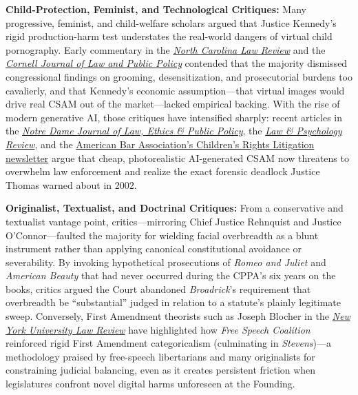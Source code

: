 \documentclass[12pt]{article}
\begin{document}
\textbf{Child-Protection, Feminist, and Technological Critiques:} Many progressive, feminist, and child-welfare scholars argued that Justice Kennedy's rigid production-harm test understates the real-world dangers of virtual child pornography. Early commentary in the \href{https://scholarship.law.unc.edu/cgi/viewcontent.cgi?article=4081&context=nclr}{\textit{North Carolina Law Review}} and the \href{https://scholarship.law.cornell.edu/cgi/viewcontent.cgi?article=1126&context=cjlpp}{\textit{Cornell Journal of Law and Public Policy}} contended that the majority dismissed congressional findings on grooming, desensitization, and prosecutorial burdens too cavalierly, and that Kennedy's economic assumption---that virtual images would drive real CSAM out of the market---lacked empirical backing. With the rise of modern generative AI, those critiques have intensified sharply: recent articles in the \href{https://scholarship.law.nd.edu/cgi/viewcontent.cgi?article=1970&context=ndjlepp}{\textit{Notre Dame Journal of Law, Ethics \& Public Policy}}, the \href{https://law.ua.edu/wp-content/uploads/2026/06/48LawPsycholRev169.pdf}{\textit{Law \& Psychology Review}}, and the \href{https://www.americanbar.org/groups/litigation/resources/newsletters/childrens-rights/when-image-is-fake-harm-real/}{American Bar Association's Children's Rights Litigation newsletter} argue that cheap, photorealistic AI-generated CSAM now threatens to overwhelm law enforcement and realize the exact forensic deadlock Justice Thomas warned about in 2002.

\textbf{Originalist, Textualist, and Doctrinal Critiques:} From a conservative and textualist vantage point, critics---mirroring Chief Justice Rehnquist and Justice O'Connor---faulted the majority for wielding facial overbreadth as a blunt instrument rather than applying canonical constitutional avoidance or severability. By invoking hypothetical prosecutions of \textit{Romeo and Juliet} and \textit{American Beauty} that had never occurred during the CPPA's six years on the books, critics argued the Court abandoned \textit{Broadrick}'s requirement that overbreadth be ``substantial'' judged in relation to a statute's plainly legitimate sweep. Conversely, First Amendment theorists such as Joseph Blocher in the \href{https://nyulawreview.org/wp-content/uploads/2018/08/NYULawReview-84-2-Blocher.pdf}{\textit{New York University Law Review}} have highlighted how \textit{Free Speech Coalition} reinforced rigid First Amendment categoricalism (culminating in \textit{Stevens})---a methodology praised by free-speech libertarians and many originalists for constraining judicial balancing, even as it creates persistent friction when legislatures confront novel digital harms unforeseen at the Founding.
\end{document}
